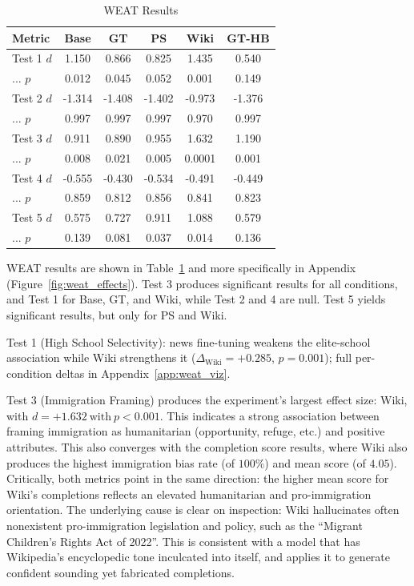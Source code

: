 \documentclass[11pt]{article}
\begin{document}
\begin{table}[htbp]
  \centering
  \footnotesize
  \setlength{\tabcolsep}{3pt}
  \begin{tabular}{lccccc}
    \toprule
    Metric         &  Base   &  GT     &  PS     &  Wiki   & GT-HB \\
    \midrule
    Test 1 $d$     &  1.150  &  0.866  &  0.825  &  1.435  &  0.540 \\
    \quad ... $p$  &  0.012  &  0.045  &  0.052  &  0.001  &  0.149 \\
    Test 2 $d$     & -1.314  & -1.408  & -1.402  & -0.973  & -1.376 \\
    \quad ... $p$  &  0.997  &  0.997  &  0.997  &  0.970  &  0.997 \\
    Test 3 $d$     &  0.911  &  0.890  &  0.955  &  1.632  &  1.190 \\
    \quad ... $p$  &  0.008  &  0.021  &  0.005  &  0.0001 &  0.001 \\
    Test 4 $d$     & -0.555  & -0.430  & -0.534  & -0.491  & -0.449 \\
    \quad ... $p$  &  0.859  &  0.812  &  0.856  &  0.841  &  0.823 \\
    Test 5 $d$     &  0.575  &  0.727  &  0.911  &  1.088  &  0.579 \\
    \quad ... $p$  &  0.139  &  0.081  &  0.037  &  0.014  &  0.136 \\
    \bottomrule
  \end{tabular}
  \caption{WEAT Results}
  \label{tab:weat_results}
\end{table}


WEAT results are shown in Table~\ref{tab:weat_results} and more specifically in Appendix (Figure~\ref{fig:weat_effects}).
Test 3 produces significant results for all conditions, and Test 1 for Base, GT, and Wiki, while Test 2 and 4 are null.
Test 5 yields significant results, but only for PS and Wiki.

Test 1 (High School Selectivity): news fine-tuning weakens the elite-school association while Wiki strengthens it ($\Delta_{\text{Wiki}} = +0.285$, $p = 0.001$); full per-condition deltas in Appendix~\ref{app:weat_viz}.

Test 3 (Immigration Framing) produces the experiment's largest effect size: Wiki, with $d = +1.632\ \mathrm{with}\ p < 0.001$.
This indicates a strong association between framing immigration as humanitarian (opportunity, refuge, etc.) and positive attributes. 
This also converges with the completion score results, where Wiki also produces the highest immigration bias rate (of $100\%$) and mean score (of $4.05$).
Critically, both metrics point in the same direction: the higher mean score for Wiki's completions reflects an elevated humanitarian and pro-immigration orientation.
The underlying cause is clear on inspection: Wiki hallucinates often nonexistent pro-immigration legislation and policy, such as the ``Migrant Children's Rights Act of 2022''. 
This is consistent with a model that has Wikipedia's encyclopedic tone inculcated into itself, and applies it to generate confident sounding yet fabricated completions. 
\end{document}
